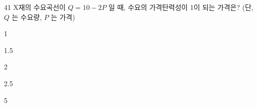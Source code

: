 \begin{question}{41}
X재의 수요곡선이 $Q=10-2P$ 일 때, 수요의 가격탄력성이 1이 되는 가격은? (단, $Q$ 는 수요량, $P$ 는 가격)
\begin{choices}
  \item 1
  \item 1.5
  \item 2
  \item 2.5
  \item 5
\end{choices}
\end{question}

